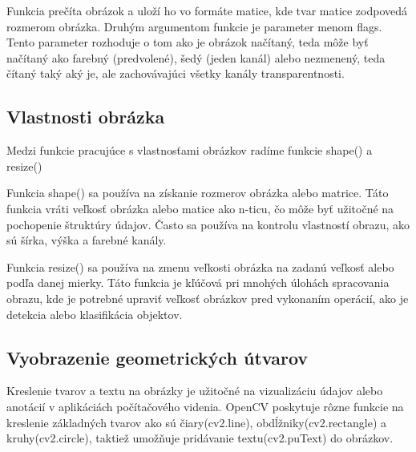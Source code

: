 Funkcia prečíta obrázok a uloží ho vo formáte matice, kde tvar matice zodpovedá rozmerom obrázka. Druhým argumentom 
funkcie je parameter menom flags. Tento parameter rozhoduje o tom ako je obrázok načítaný, teda môže byť načítaný 
ako farebný (predvolené), šedý (jeden kanál) alebo nezmenený, teda čítaný taký aký je, ale zachovávajúci všetky 
kanály transparentnosti.

\subsection{Vlastnosti obrázka}
Medzi funkcie pracujúce s vlastnosťami obrázkov radíme funkcie shape() a resize()

Funkcia shape() sa používa na získanie rozmerov obrázka alebo matrice. Táto funkcia vráti veľkosť obrázka alebo 
matice ako n-ticu, čo môže byť užitočné na pochopenie štruktúry údajov. Často sa používa na kontrolu vlastností 
obrazu, ako sú šírka, výška a farebné kanály.

Funkcia resize() sa používa na zmenu veľkosti obrázka na zadanú veľkosť alebo podľa danej mierky. Táto funkcia 
je kľúčová pri mnohých úlohách spracovania obrazu, kde je potrebné upraviť veľkosť obrázkov pred vykonaním operácií, 
ako je detekcia alebo klasifikácia objektov.

\subsection{Vyobrazenie geometrických útvarov}
Kreslenie tvarov a textu na obrázky je užitočné na vizualizáciu údajov alebo anotácií v aplikáciách počítačového 
videnia. OpenCV poskytuje rôzne funkcie na kreslenie základných tvarov ako sú čiary(cv2.line), obdĺžniky(cv2.rectangle) 
a kruhy(cv2.circle), taktiež umožňuje pridávanie textu(cv2.puText) do obrázkov.


